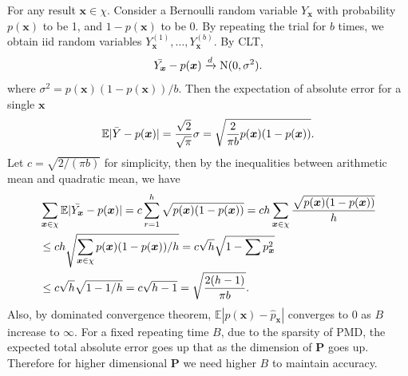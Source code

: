 \documentclass[12pt]{article}
\newcommand{\EE}{\mathbb{E}}
\newcommand{\Pmat}{\mathbf{P}}
\newcommand{\PMD}{\textrm{PMD}}
\newcommand{\wh}{\widehat}
\newcommand{\xvec}{\boldsymbol{x}}
\begin{document}
For any result $\xvec \in \chi$. Consider a Bernoulli random variable $Y_{\xvec}$ with probability $p(\xvec)$ to be 1, and $1-p(\xvec)$ to be 0. By repeating the trial for $b$ times, we obtain iid random variables $Y_{\xvec}^{(1)},\dots,Y_{\xvec}^{(b)}$. By CLT,
\begin{equation*}
    \Bar{Y_{\xvec}}-p(\xvec) \xrightarrow{d} \textrm{N}(0,\sigma^2).
\end{equation*}
where $\sigma^2 = p(\xvec)(1-p(\xvec))/b$. Then the expectation of absolute error for a single $\xvec$
\begin{equation*}
    \EE |\Bar{Y}-p(\xvec)| = \frac{\sqrt{2}}{\sqrt{\pi}}\sigma = \sqrt{\frac{2}{\pi b}p(\xvec)(1-p(\xvec))}.
\end{equation*}
Let $c = \sqrt{2/(\pi b)}$ for simplicity, then by the inequalities between arithmetic mean and quadratic mean, we have
\begin{align*}
    & \sum_{\xvec \in \chi}\EE |\Bar{Y_{\xvec}}-p(\xvec)| = c \sum_{r=1}^{h} \sqrt{p(\xvec)(1-p(\xvec))}  = c h \sum_{\xvec\in\chi}\frac{\sqrt{p(\xvec)(1-p(\xvec))}}{h} \\
    & \leq c h \sqrt{\sum_{\xvec \in \chi}p(\xvec)(1-p(\xvec))/h} = c \sqrt{h} \sqrt{1-\sum p_{\xvec}^2} \\ &\leq c \sqrt{h} \sqrt{1-1/h} = c\sqrt{h-1} = \sqrt{\frac{2(h-1)}{\pi b}}.
\end{align*}
Also, by dominated convergence theorem, 
$\EE|p(\xvec) - \wh{p}_{\xvec}|$ converges to 0 as $B$ increase to $\infty$.
For a fixed repeating time $B$, due to the sparsity of $\PMD$, the expected total absolute error goes up that as the dimension of $\Pmat$ goes up. Therefore for higher dimensional $\Pmat$ we need higher $B$ to maintain accuracy.

\end{document}
